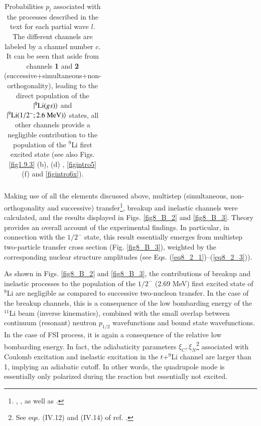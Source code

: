 \begin{table}
\begin{center}
\begin{tabular}{|c|c|c|c|c|c|}
 			\hline
 		\end{tabular}
 		\caption{Probabilities $p_l$  associated with the processes described in the text for each partial wave $l$. The different channels are labeled by a channel number $c$.  It can be seen that aside from channels \textbf{1}  and \textbf{2} (successive+simultaneous+non-orthogonality), leading to the direct population of the $|{^9\text{Li}(gs)} \rangle$ and $|{^9\text{Li}(1/2^-;2.6\text{ MeV})} \rangle$  states,  all other channels provide a negligible contribution to the population of the $^9$Li first excited state (see also Figs. \ref{fig1.9.3} (b), (d) , \ref{figintro5} (f) and \ref{figintro6x}).}\label{tab8_B_1}
 	\end{center}
 \end{table}
 
 
 Making use of all the elements discussed above, multistep (simultaneous, non-orthogonality and successive) transfer\footnote{\cite{Bayman:82}, \cite{Igarashi:91},  \cite{Bayman:73} as well as \cite{Broglia:04a}.}, breakup and inelastic channels were calculated, and the results displayed in Figs. \ref{fig8_B_2} and \ref{fig8_B_3}. Theory provides an overall account of the experimental findings. In particular, in connection with the $1/2^-$ state, this result essentially emerges from  multistep two-particle transfer cross section (Fig. \ref{fig8_B_3}), weighted by the corresponding nuclear structure amplitudes  (see Eqs. (\ref{eq8_2_1})--(\ref{eq8_2_3})). 
 
 
 As shown in Figs. \ref{fig8_B_2} and \ref{fig8_B_3}, the contributions of breakup  and inelastic  processes to the population of the $1/2^-$ (2.69 MeV) first excited state of $^9$Li are negligible as compared to successive two-nucleon transfer. In the case of the breakup channels, this is a consequence of the low bombarding energy of the $^{11}$Li beam (inverse kinematics), combined with the small overlap between continuum (resonant) neutron $p_{1/2}$ wavefunctions and  bound state wavefunctions. In the case of  FSI process, it is again a consequence of the relative low bombarding energy. In fact, the adiabaticity parameters $\xi_C,\xi_N$\footnote{See eqs. (IV.12) and (IV.14) of ref. \cite{Broglia:04a}.} associated with Coulomb excitation and inelastic excitation in the $t$+$^9$Li channel are larger than 1, implying an adiabatic cutoff. In other words, the quadrupole mode is essentially only polarized during the reaction but essentially not excited. 
 
